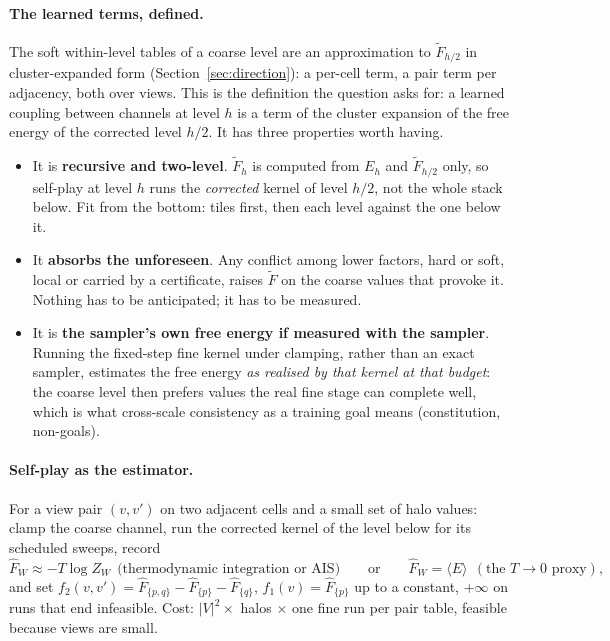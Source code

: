\documentclass[11pt]{article}
\newcommand{\1}{\mathds{1}}
\begin{document}
\paragraph{The learned terms, defined.} The soft within-level tables of a
coarse level are an approximation to $\tilde F_{h/2}$ in cluster-expanded
form (Section~\ref{sec:direction}): a per-cell term, a pair term per
adjacency, both over views. This is the definition the question asks for: a
learned coupling between channels at level $h$ is a term of the cluster
expansion of the free energy of the corrected level $h/2$. It has three
properties worth having.
\begin{itemize}
  \item It is \textbf{recursive and two-level}. $\tilde F_h$ is computed from
        $E_h$ and $\tilde F_{h/2}$ only, so self-play at level $h$ runs the
        \emph{corrected} kernel of level $h/2$, not the whole stack below. Fit
        from the bottom: tiles first, then each level against the one below it.
  \item It \textbf{absorbs the unforeseen}. Any conflict among lower factors,
        hard or soft, local or carried by a certificate, raises $\tilde F$ on the
        coarse values that provoke it. Nothing has to be anticipated; it has
        to be measured.
  \item It is \textbf{the sampler's own free energy if measured with the sampler}.
        Running the fixed-step fine kernel under clamping, rather than an exact
        sampler, estimates the free energy \emph{as realised by that kernel at
        that budget}: the coarse level then prefers values the real fine stage
        can complete well, which is what cross-scale consistency as a training
        goal means (constitution, non-goals).
\end{itemize}

\paragraph{Self-play as the estimator.} For a view pair $(v, v')$ on two
adjacent cells and a small set of halo values: clamp the coarse channel, run
the corrected kernel of the level below for its scheduled sweeps, record
\[
  \hat F_W \approx -T\log Z_W \ \ \text{(thermodynamic integration or AIS)}
  \qquad\text{or}\qquad
  \hat F_W = \langle E \rangle \ \ (\text{the } T \to 0 \text{ proxy}),
\]
and set $f_2(v, v') = \hat F_{\{p,q\}} - \hat F_{\{p\}} - \hat F_{\{q\}}$, $f_1(v) = \hat F_{\{p\}}$
up to a constant, $+\infty$ on runs that end infeasible. Cost:
$|V|^2 \times$ halos $\times$ one fine run per pair table, feasible because
views are small.
\end{document}
